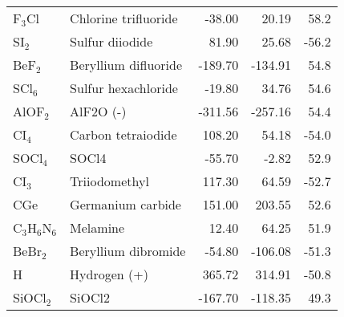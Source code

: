 \begin{table}
\begin{center}
\begin{tabular}{llrrr}
 F$_3$Cl              & Chlorine trifluoride                   &  -38.00   &    20.19   &   58.2\\
 SI$_2$               & Sulfur diiodide                        &   81.90   &    25.68   &  -56.2\\
 BeF$_2$              & Beryllium difluoride                   & -189.70   &  -134.91   &   54.8\\
 SCl$_6$              & Sulfur hexachloride                    &  -19.80   &    34.76   &   54.6\\
 AlOF$_2$             & AlF2O (-)                              & -311.56   &  -257.16   &   54.4\\
 CI$_4$               & Carbon tetraiodide                     &  108.20   &    54.18   &  -54.0\\
 SOCl$_4$             & SOCl4                                  &  -55.70   &    -2.82   &   52.9\\
 CI$_3$               & Triiodomethyl                          &  117.30   &    64.59   &  -52.7\\
 CGe                  & Germanium carbide                      &  151.00   &   203.55   &   52.6\\
 C$_3$H$_6$N$_6$      & Melamine                               &   12.40   &    64.25   &   51.9\\
 BeBr$_2$             & Beryllium dibromide                    &  -54.80   &  -106.08   &  -51.3\\
 H                    & Hydrogen (+)                           &  365.72   &   314.91   &  -50.8\\
 SiOCl$_2$            & SiOCl2                                 & -167.70   &  -118.35   &   49.3\\
\hline
\end{tabular}
\end{center}
\end{table}
